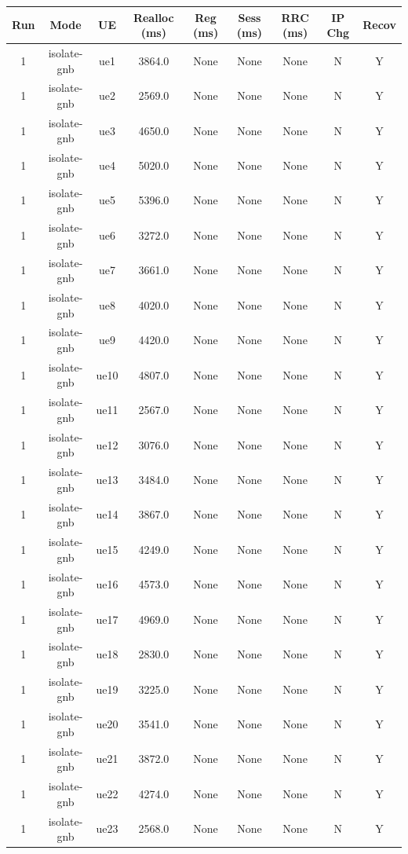 \begin{table}[ht]
\centering
\begin{tabular}{|c|c|c|c|c|c|c|c|c|}
\hline
Run & Mode & UE & Realloc (ms) & Reg (ms) & Sess (ms) & RRC (ms) & IP Chg & Recov \\
\hline
1 & isolate-gnb & ue1 & 3864.0 & None & None & None & N & Y \\
1 & isolate-gnb & ue2 & 2569.0 & None & None & None & N & Y \\
1 & isolate-gnb & ue3 & 4650.0 & None & None & None & N & Y \\
1 & isolate-gnb & ue4 & 5020.0 & None & None & None & N & Y \\
1 & isolate-gnb & ue5 & 5396.0 & None & None & None & N & Y \\
1 & isolate-gnb & ue6 & 3272.0 & None & None & None & N & Y \\
1 & isolate-gnb & ue7 & 3661.0 & None & None & None & N & Y \\
1 & isolate-gnb & ue8 & 4020.0 & None & None & None & N & Y \\
1 & isolate-gnb & ue9 & 4420.0 & None & None & None & N & Y \\
1 & isolate-gnb & ue10 & 4807.0 & None & None & None & N & Y \\
1 & isolate-gnb & ue11 & 2567.0 & None & None & None & N & Y \\
1 & isolate-gnb & ue12 & 3076.0 & None & None & None & N & Y \\
1 & isolate-gnb & ue13 & 3484.0 & None & None & None & N & Y \\
1 & isolate-gnb & ue14 & 3867.0 & None & None & None & N & Y \\
1 & isolate-gnb & ue15 & 4249.0 & None & None & None & N & Y \\
1 & isolate-gnb & ue16 & 4573.0 & None & None & None & N & Y \\
1 & isolate-gnb & ue17 & 4969.0 & None & None & None & N & Y \\
1 & isolate-gnb & ue18 & 2830.0 & None & None & None & N & Y \\
1 & isolate-gnb & ue19 & 3225.0 & None & None & None & N & Y \\
1 & isolate-gnb & ue20 & 3541.0 & None & None & None & N & Y \\
1 & isolate-gnb & ue21 & 3872.0 & None & None & None & N & Y \\
1 & isolate-gnb & ue22 & 4274.0 & None & None & None & N & Y \\
1 & isolate-gnb & ue23 & 2568.0 & None & None & None & N & Y \\

\end{tabular}
\end{table}
